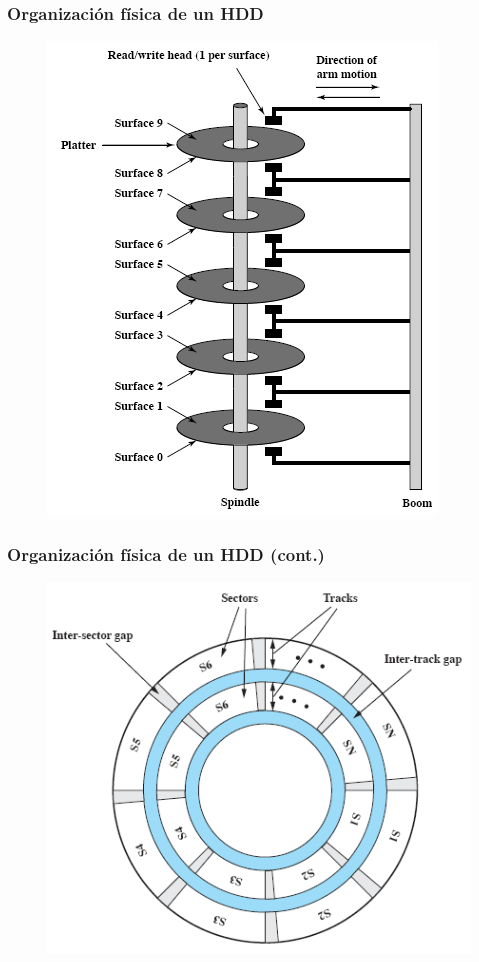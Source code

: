 \begin{frame}
  \frametitle{Organización física de un \textbf{HDD}}
  \begin{figure}
    \includegraphics[scale=0.4]{images/disk1.png}
  \end{figure}
\end{frame}

\begin{frame}
  \frametitle{Organización física de un \textbf{HDD} (cont.)}
  \begin{figure}
    \includegraphics[scale=0.4]{images/disk2.png}
  \end{figure}
\end{frame}

